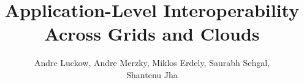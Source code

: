 \documentclass[graybox]{svmult}
\begin{document}
\title{Application-Level Interoperability Across Grids and Clouds}

\author{Andre Luckow, Andre Merzky, Miklos Erdely, Saurabh Sehgal,\\  Shantenu Jha}



\newif\ifdraft
\ifdraft
 \newcommand{\amnote}[1]{     {\textcolor{magenta} { ***AM: #1 }}}
 \newcommand{\jhanote}[1]{    {\textcolor{red}     { ***SJ: #1 }}}
 \newcommand{\miklosnote}[1]{ {\textcolor{blue}    { ***ME: #1 }}}
 \newcommand{\ssnote}[1]{     {\textcolor{blue}    { ***SS: #1 }}}
 \newcommand{\alnote}[1]{     {\textcolor{blue}    { ***AL: #1 }}}
\else
 \newcommand{\amnote}[1]{}
 \newcommand{\jhanote}[1]{}
 \newcommand{\miklosnote}[1]{}
 \newcommand{\ssnote}[1]{}
  \newcommand{\alnote}[1]{}
\fi

\newcommand{\sagamapreduce}{SAGA-MapReduce\xspace}
\newcommand{\smr}{\sagamapreduce}
\newcommand{\mr}{MapReduce\xspace}
\newcommand{\tc}{$T_c$\xspace}
\newcommand{\wc}{wordcount\xspace}
\newcommand{\Wc}{Wordcount\xspace}

\newcommand{\dn}{\vspace*{0.33em}}
\newcommand{\dnn}{\vspace*{0.66em}}
\newcommand{\dnnn}{\vspace*{1em}}
\newcommand{\uppp}{\vspace*{-1em}}
\newcommand{\upp}{\vspace*{-0.66em}}
\newcommand{\up}{\vspace*{-0.33em}}
\newcommand{\shift}{\hspace*{1.00em}}
\end{document}
